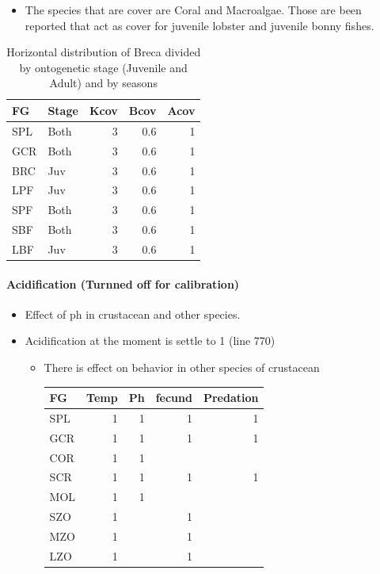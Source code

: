\documentclass[11pt]{article}
\begin{document}
\begin{itemize}
\item The species that are cover are Coral and Macroalgae. Those are been reported that act as cover for juvenile lobster and juvenile bonny fishes.
\end{itemize}
\begin{table}[htb]
\caption{Horizontal distribution of Breca divided by ontogenetic stage (Juvenile and Adult) and by seasons}
\begin{center}
\begin{tabular}{llrrr}
 FG   &  Stage  &  Kcov  &  Bcov  &  Acov  \\
\hline
 SPL  &  Both   &     3  &   0.6  &     1  \\
 GCR  &  Both   &     3  &   0.6  &     1  \\
 BRC  &  Juv    &     3  &   0.6  &     1  \\
 LPF  &  Juv    &     3  &   0.6  &     1  \\
 SPF  &  Both   &     3  &   0.6  &     1  \\
 SBF  &  Both   &     3  &   0.6  &     1  \\
 LBF  &  Juv    &     3  &   0.6  &     1  \\
\end{tabular}
\end{center}
\end{table}
\paragraph*{Acidification (Turnned off for calibration)}
\label{sec-5-2-1-3}

\begin{itemize}
\item Effect of ph in crustacean and other species.
\item Acidification at the moment is settle to 1 (line 770)
\begin{itemize}
\item There is effect on behavior in other species of crustacean


\begin{center}
\begin{tabular}{lrrrr}
 FG   &  Temp  &  Ph  &  fecund  &  Predation  \\
\hline
 SPL  &     1  &   1  &       1  &          1  \\
 GCR  &     1  &   1  &       1  &          1  \\
 COR  &     1  &   1  &          &             \\
 SCR  &     1  &   1  &       1  &          1  \\
 MOL  &     1  &   1  &          &             \\
 SZO  &     1  &      &       1  &             \\
 MZO  &     1  &      &       1  &             \\
 LZO  &     1  &      &       1  &             \\
\end{tabular}
\end{center}


\end{itemize}
\end{itemize}
\end{document}
